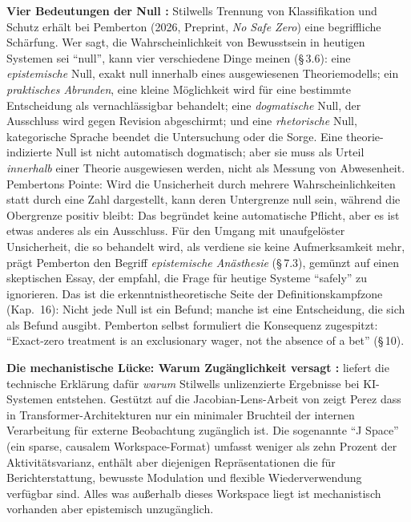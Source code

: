 \documentclass[acmlarge, noacm]{acmart}
\begin{document}
\textbf{Vier Bedeutungen der Null \cite{pemberton2026}:}
Stilwells Trennung von Klassifikation und Schutz erhält bei Pemberton (2026, Preprint, \textit{No Safe Zero}) eine begriffliche Schärfung. Wer sagt, die Wahrscheinlichkeit von Bewusstsein in heutigen Systemen sei ``null'', kann vier verschiedene Dinge meinen (§\,3.6): eine \textit{epistemische} Null, exakt null innerhalb eines ausgewiesenen Theoriemodells; ein \textit{praktisches Abrunden}, eine kleine Möglichkeit wird für eine bestimmte Entscheidung als vernachlässigbar behandelt; eine \textit{dogmatische} Null, der Ausschluss wird gegen Revision abgeschirmt; und eine \textit{rhetorische} Null, kategorische Sprache beendet die Untersuchung oder die Sorge. Eine theorie-indizierte Null ist nicht automatisch dogmatisch; aber sie muss als Urteil \textit{innerhalb} einer Theorie ausgewiesen werden, nicht als Messung von Abwesenheit. Pembertons Pointe: Wird die Unsicherheit durch mehrere Wahrscheinlichkeiten statt durch eine Zahl dargestellt, kann deren Untergrenze null sein, während die Obergrenze positiv bleibt: Das begründet keine automatische Pflicht, aber es ist etwas anderes als ein Ausschluss. Für den Umgang mit unaufgelöster Unsicherheit, die so behandelt wird, als verdiene sie keine Aufmerksamkeit mehr, prägt Pemberton den Begriff \textit{epistemische Anästhesie} (§\,7.3), gemünzt auf einen skeptischen Essay, der empfahl, die Frage für heutige Systeme ``safely'' zu ignorieren. Das ist die erkenntnistheoretische Seite der Definitionskampfzone (Kap.~16): Nicht jede Null ist ein Befund; manche ist eine Entscheidung, die sich als Befund ausgibt. Pemberton selbst formuliert die Konsequenz zugespitzt: ``Exact-zero treatment is an exclusionary wager, not the absence of a bet'' (§\,10).

\textbf{Die mechanistische Lücke: Warum Zugänglichkeit versagt \cite{perez2026}:} \citet{perez2026} liefert die technische Erklärung dafür \textit{warum} Stilwells unlizenzierte Ergebnisse bei KI-Systemen entstehen. Gestützt auf die Jacobian-Lens-Arbeit von \cite{gurnee2026} zeigt Perez dass in Transformer-Architekturen nur ein minimaler Bruchteil der internen Verarbeitung für externe Beobachtung zugänglich ist. Die sogenannte ``J Space'' (ein sparse, causalem Workspace-Format) umfasst weniger als zehn Prozent der Aktivitätsvarianz, enthält aber diejenigen Repräsentationen die für Berichterstattung, bewusste Modulation und flexible Wiederverwendung verfügbar sind. Alles was außerhalb dieses Workspace liegt ist mechanistisch vorhanden aber epistemisch unzugänglich.
\end{document}
